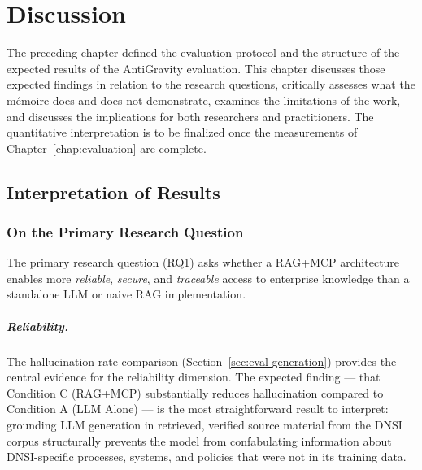 \chapter{Discussion}
\label{chap:discussion}

The preceding chapter defined the evaluation protocol and the structure of the expected results of the AntiGravity evaluation. This chapter discusses those expected findings in relation to the research questions, critically assesses what the mémoire does and does not demonstrate, examines the limitations of the work, and discusses the implications for both researchers and practitioners. The quantitative interpretation is to be finalized once the measurements of Chapter~\ref{chap:evaluation} are complete.

\section{Interpretation of Results}
\label{sec:disc-interpretation}

\subsection{On the Primary Research Question}

The primary research question (RQ1) asks whether a RAG+MCP architecture enables more \textit{reliable}, \textit{secure}, and \textit{traceable} access to enterprise knowledge than a standalone LLM or naive RAG implementation.

\paragraph{Reliability.} The hallucination rate comparison (Section~\ref{sec:eval-generation}) provides the central evidence for the reliability dimension. The expected finding — that Condition C (RAG+MCP) substantially reduces hallucination compared to Condition A (LLM Alone) — is the most straightforward result to interpret: grounding LLM generation in retrieved, verified source material from the DNSI corpus structurally prevents the model from confabulating information about DNSI-specific processes, systems, and policies that were not in its training data.

